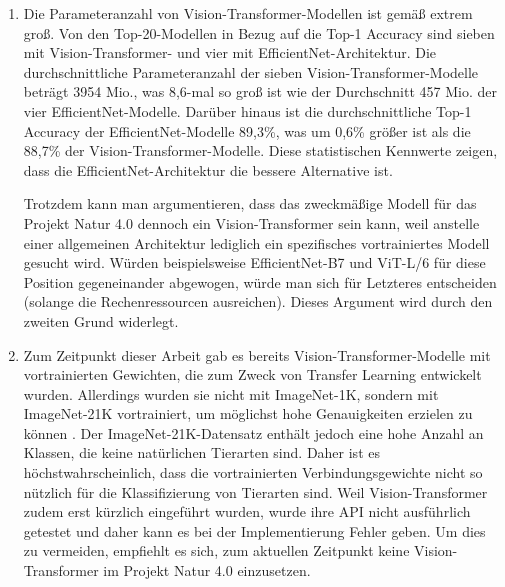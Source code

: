 \begin{enumerate}
	\item Die Parameteranzahl von Vision-Transformer-Modellen ist gemäß \cite{PapersWithCode-ImageNet} extrem groß. Von den Top-20-Modellen in Bezug auf die Top-1 Accuracy sind sieben mit Vision-Transformer- und vier mit EfficientNet-Architektur. Die durchschnittliche Parameteranzahl der sieben Vision-Transformer-Modelle beträgt 3954 Mio., was 8,6-mal so groß ist wie der Durchschnitt 457 Mio. der vier EfficientNet-Modelle. Darüber hinaus ist die durchschnittliche Top-1 Accuracy der EfficientNet-Modelle 89,3\%, was um 0,6\% größer ist als die 88,7\% der Vision-Transformer-Modelle. Diese statistischen Kennwerte zeigen, dass die EfficientNet-Architektur die bessere Alternative ist.
	
	Trotzdem kann man argumentieren, dass das zweckmäßige Modell für das Projekt Natur 4.0 dennoch ein Vision-Transformer sein kann, weil anstelle einer allgemeinen Architektur lediglich ein spezifisches vortrainiertes Modell gesucht wird. Würden beispielsweise EfficientNet-B7 und ViT-L/6 für diese Position gegeneinander abgewogen, würde man sich für Letzteres entscheiden (solange die Rechenressourcen ausreichen). Dieses Argument wird durch den zweiten Grund widerlegt.
	
	\item Zum Zeitpunkt dieser Arbeit gab es bereits Vision-Transformer-Modelle mit vortrainierten Gewichten, die zum Zweck von Transfer Learning entwickelt wurden. Allerdings wurden sie nicht mit ImageNet-1K, sondern mit ImageNet-21K vortrainiert, um möglichst hohe Genauigkeiten erzielen zu können \cite[6]{dosovitskiy2021image}. Der ImageNet-21K-Datensatz enthält jedoch eine hohe Anzahl an Klassen, die keine natürlichen Tierarten sind. Daher ist es höchstwahrscheinlich, dass die vortrainierten Verbindungsgewichte nicht so nützlich für die Klassifizierung von Tierarten sind. Weil Vision-Transformer zudem erst kürzlich eingeführt wurden, wurde ihre API nicht ausführlich getestet und daher kann es bei der Implementierung Fehler geben. Um dies zu vermeiden, empfiehlt es sich, zum aktuellen Zeitpunkt keine Vision-Transformer im Projekt Natur 4.0 einzusetzen.
\end{enumerate}

